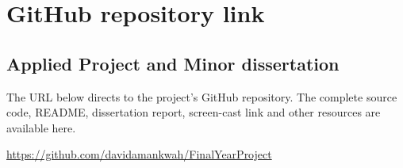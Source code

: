 \appendix
\chapter{GitHub repository link}

\section{Applied Project and Minor dissertation}

The URL below directs to the project's GitHub repository. The complete source code, README, dissertation report, screen-cast link and other resources are available here.

\href{https://github.com/davidamankwah/Final_YearProject}{https://github.com/davidamankwah/Final\textunderscore YearProject}

